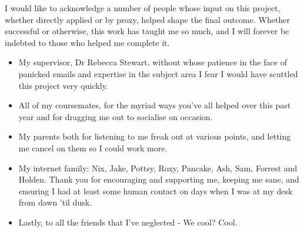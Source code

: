 I would like to acknowledge a number of people whose input on this project, whether directly applied or by proxy, helped shape the final outcome. Whether successful or otherwise, this work has taught me so much, and I will forever be indebted to those who helped me complete it.
\begin{itemize}

\item My supervisor, Dr Rebecca Stewart, without whose patience in the face of panicked emails and expertise in the subject area I fear I would have scuttled this project very quickly. 

\item All of my coursemates, for the myriad ways you've all helped over this past year and for dragging me out to socialise on occasion.

\item My parents both for listening to me freak out at various points, and letting me cancel on them so I could work more. 

\item My internet family: Nix, Jake, Pottsy, Roxy, Pancake, Ash, Sam, Forrest and Holden. Thank you for encouraging and supporting me, keeping me sane, and ensuring I had at least some human contact on days when I was at my desk from dawn 'til dusk.
 
\item Lastly, to all the friends that I've neglected - We cool? Cool.
\end{itemize}
